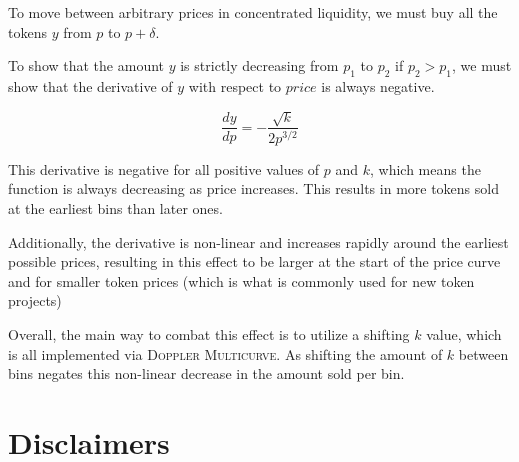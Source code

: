 \documentclass[sigconf,nonacm,prologue,table]{acmart}
\numberwithin{equation}{section}
\theoremstyle{definition}
\theoremstyle{remark}
\begin{document}
To move between arbitrary prices in concentrated liquidity, we must buy all the tokens $y$ from $p$ to $p+\delta$.

To show that the amount $y$ is strictly decreasing from $p_1$ to $p_2$ if $p_2 > p_1$, we must show that the derivative of $y$ with respect to $price$ is always negative.

\begin{equation}
   \frac{dy}{dp}  = -\frac{\sqrt k}{2 p^{3/2}}
\end{equation}

This derivative is negative for all positive values of $p$ and $k$, which means the function is always decreasing as price increases. This results in more tokens sold at the earliest bins than later ones.


Additionally, the derivative is non-linear and increases rapidly around the earliest possible prices, resulting in this effect to be larger at the start of the price curve and for smaller token prices (which is what is commonly used for new token projects)

Overall, the main way to combat this effect is to utilize a shifting $k$ value, which is all implemented via \textsc{Doppler Multicurve}. As shifting the amount of $k$ between bins negates this non-linear decrease in the amount sold per bin.

\newpage




\section{Disclaimers}
\end{document}

